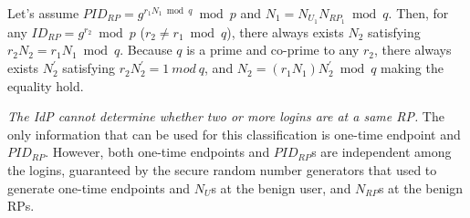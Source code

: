 Let's assume $PID_{RP} = g^{r_1N_1 \bmod q} \bmod p$ and $N_1=N_{U_1}N_{RP_1} \bmod q$.
Then, %
               for any $ID_{RP} = g^{r_2} \bmod p$ ($r_2 \neq r_1 \bmod q$),
               there always exists $N_2$ satisfying $r_2N_2=r_1N_1 \bmod q$.
Because $q$ is a prime and co-prime to any $r_2$,
    there always exists $N_2^{'}$ satisfying $r_2N_2^{'}=1\ mod\ q$,
               and $N_2=(r_1N_1)N_2^{'} \bmod q$ making the equality hold.



\emph{The IdP cannot determine whether two or more logins are at a same RP.}
The only information that can be used for this classification is one-time endpoint and $PID_{RP}$. However, both one-time endpoints and $PID_{RP}$s are independent among the logins, guaranteed by the secure random number generators that used to generate one-time endpoints and $N_{U}$s at the benign user, and $N_{RP}$s at the benign RPs.

